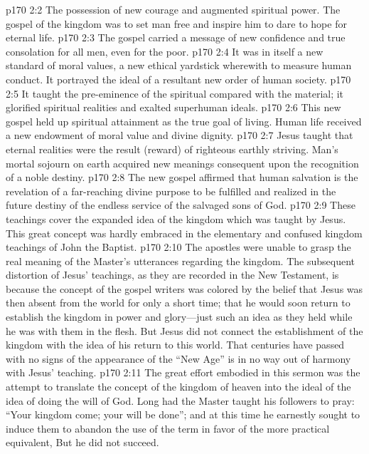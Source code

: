 \pc \vs p170 2:2 \bibnobreakspace The possession of new courage and augmented spiritual power. The gospel of the kingdom was to set man free and inspire him to dare to hope for eternal life.
\pc \vs p170 2:3 \bibnobreakspace The gospel carried a message of new confidence and true consolation for all men, even for the poor.
\pc \vs p170 2:4 \bibnobreakspace It was in itself a new standard of moral values, a new ethical yardstick wherewith to measure human conduct. It portrayed the ideal of a resultant new order of human society.
\pc \vs p170 2:5 \bibnobreakspace It taught the pre\hyp{}eminence of the spiritual compared with the material; it glorified spiritual realities and exalted superhuman ideals.
\pc \vs p170 2:6 \bibnobreakspace This new gospel held up spiritual attainment as the true goal of living. Human life received a new endowment of moral value and divine dignity.
\pc \vs p170 2:7 \bibnobreakspace Jesus taught that eternal realities were the result (reward) of righteous earthly striving. Man’s mortal sojourn on earth acquired new meanings consequent upon the recognition of a noble destiny.
\pc \vs p170 2:8 \bibnobreakspace The new gospel affirmed that human salvation is the revelation of a far\hyp{}reaching divine purpose to be fulfilled and realized in the future destiny of the endless service of the salvaged sons of God.
\pc \vs p170 2:9 These teachings cover the expanded idea of the kingdom which was taught by Jesus. This great concept was hardly embraced in the elementary and confused kingdom teachings of John the Baptist.
\vs p170 2:10 The apostles were unable to grasp the real meaning of the Master’s utterances regarding the kingdom. The subsequent distortion of Jesus’ teachings, as they are recorded in the New Testament, is because the concept of the gospel writers was colored by the belief that Jesus was then absent from the world for only a short time; that he would soon return to establish the kingdom in power and glory---just such an idea as they held while he was with them in the flesh. But Jesus did not connect the establishment of the kingdom with the idea of his return to this world. That centuries have passed with no signs of the appearance of the “New Age” is in no way out of harmony with Jesus’ teaching.
\vs p170 2:11 The great effort embodied in this sermon was the attempt to translate the concept of the kingdom of heaven into the ideal of the idea of doing the will of God. Long had the Master taught his followers to pray: \textcolor{ubdarkred}{“Your kingdom come; your will be done”;} and at this time he earnestly sought to induce them to abandon the use of the term  in favor of the more practical equivalent,  But he did not succeed.
